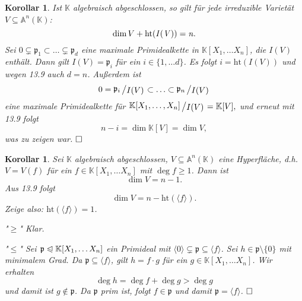 \documentclass[11pt]{book}
\newtheorem{cor}[theorem]{Korollar}
\theoremstyle{nonumberbreak}
\newenvironment{pr}[1][]{\ifthenelse{\equal{#1}{}}{\proof}{\proof[#1]}\rm}{\endproof}
\newenvironment{definprop}[1][]{\ifthenelse{\equal{#1}{}}{\definiprop}{\definiprop[#1]}\rm}{\enddefiniprop}
\newcommand{\slant}[2]{{\raisebox{.1em}{$#1$}\left/\raisebox{-.1em}{$#2$}\right.}}
\begin{document}
\begin{spacing}{1.3}
\begin{definprop}
\begin{pr}
\begin{compactenum}
\end{compactenum}
\end{pr}
\end{definprop}


\begin{cor} %

Ist $\mathbb{K}$ algebraisch abgeschlossen, so gilt für jede irreduzible Varietät $V \subseteq \mathbb{A}^n(\mathbb{K})$:
$$\dim V + \rm{ht}\it(I(V)) = n.$$
\begin{pr}
Sei
$0 \subsetneq \mathfrak{p}_1 \subset \ldots \subsetneq \mathfrak{p}_d$
eine maximale Primidealkette in $\mathbb{K}[X_1, \ldots X_n]$, die $I(V)$ enthält. Dann gilt $I(V) = \mathfrak{p}_i$ für ein $i \in \{1, \ldots d \}$. Es folgt $i = \textrm{ht}(I(V))$ und wegen 13.9 auch $d=n$. Außerdem ist
$$0 = \slant{\mathfrak{p}_i}{I(V)} \subset \ldots \subset \slant{\mathfrak{p}_n}{I(V)}$$
eine maximale Primidealkette für
$\slant{\mathbb{K}[X_1, \ldots, X_n]}{I(V)} = \mathbb{K}[V],$
und erneut mit 13.9 folgt
$$n-i = \dim \mathbb{K}[V] = \dim V,$$
was zu zeigen war. $\hfill \Box$
\end{pr}
\end{cor}


\begin{cor} %

Sei $\mathbb{K}$ algebraisch abgeschlossen, $V \subseteq \mathbb{A}^n(\mathbb{K})$ eine Hyperfläche, d.h. $V=V(f)$ für ein $f \in \mathbb{K}[X_1, \ldots X_n]$ mit $\deg f \geqslant 1 $. Dann ist 
$$\dim V = n-1.$$
\begin{pr}
Aus 13.9 folgt
$$\dim V = n - \textrm{ht}(\langle f \rangle ).$$
Zeige also: $\textrm{ht}(\langle f \rangle ) =1$. 
\begin{compactenum}
\item["$\geqslant$"] Klar.
\item["$\leqslant$"] Sei $\mathfrak{p} \trianglelefteqslant \mathbb{K}[X_1, \ldots X_n]$ ein Primideal mit $\langle 0 \rangle \subsetneq \mathfrak{p} \subseteq \langle f \rangle$. Sei $h \in \mathfrak{p} \setminus \{0\}$ mit minimalem Grad. Da $\mathfrak{p} \subseteq \langle f \rangle$, gilt $h = f \cdot g $ für ein $g \in \mathbb{K}[X_1, \ldots X_n]$. Wir erhalten
$$\deg h = \deg f + \deg g > \deg g$$
und damit ist $g \notin \mathfrak{p}$. Da $\mathfrak{p}$ prim ist, folgt $f \in \mathfrak{p}$ und damit $\mathfrak{p}= \langle f \rangle$. $\hfill \Box$
\end{compactenum}
\end{pr}
\end{cor}


\end{spacing}
\end{document}
